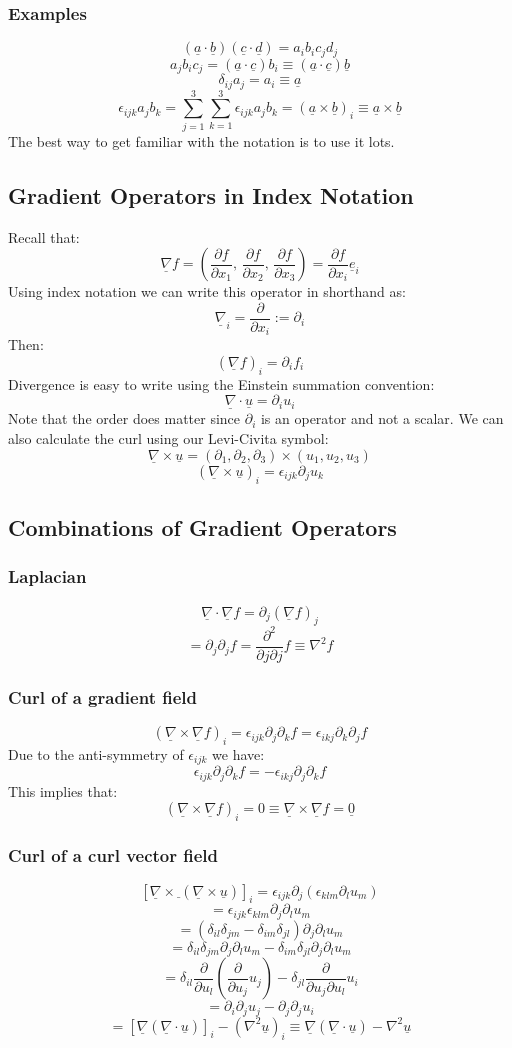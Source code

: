 \documentclass[12pt]{article}
\newcommand{\pf}[2]{\frac{\partial #1}{\partial #2}}
\newcommand{\dive}[1]{\underline{\nabla}\cdot\underline{#1}}
\newcommand{\grad}[1]{\underline{\nabla}#1}
\newcommand{\curl}[1]{\underline{\nabla}\times \underline{#1}}
\begin{document}
\subsubsection{Examples}
\[(\underline{a}\cdot\underline{b})(\underline{c}\cdot\underline{d})=a_ib_ic_jd_j\]
\[a_{j}b_ic_j=(\underline{a}\cdot\underline{c})b_i\equiv (\underline{a}\cdot \underline{c})\underline{b}\]
\[\delta_{ij}a_j=a_i\equiv\underline{a}\]
\[\epsilon_{ijk}a_jb_k=\sum^3_{j=1}\sum^3_{k=1}\epsilon_{ijk}a_jb_k=(\underline{a}\times\underline{b})_i\equiv \underline{a}\times \underline{b}\]
The best way to get familiar with the notation is to use it lots.
\subsection{Gradient Operators in Index Notation}
Recall that:
\[\grad{f}=\left(\pf{f}{x_1},\,\pf{f}{x_2},\,\pf{f}{x_3}\right)=\pf{f}{x_i}\underline{e}_i\]
Using index notation we can write this operator in shorthand as:
\[\underline{\nabla}_i=\pf{}{x_i}:=\partial_i\]
Then:
\[(\grad{f})_i=\partial_if_i\]
Divergence is easy to write using the Einstein summation convention:
\[\dive{u}=\partial_iu_i\]
Note that the order does matter since \(\partial_i\) is an operator and not a scalar. We can also calculate the curl using our Levi-Civita symbol:
\[\curl{u}=\left(\partial_1,\partial_2,\partial_3\right)\times(u_1,u_2,u_3)\]
\[(\curl{u})_i=\epsilon_{ijk}\partial_ju_k\]
\subsection{Combinations of Gradient Operators}
\subsubsection{Laplacian}
\[\dive{\nabla}f=\partial_j(\grad{f})_j\]
\[=\partial_j\partial_jf=\pf{^2}{j\partial j}f\equiv \nabla^2f\]
\subsubsection{Curl of a gradient field}
\[(\curl{\nabla}f)_i=\epsilon_{ijk}\partial_j\partial_kf=\epsilon_{ikj}\partial_k\partial_jf\]
Due to the anti-symmetry of \(\epsilon_{ijk}\) we have:
\[\epsilon_{ijk}\partial_j\partial_kf=-\epsilon_{ikj}\partial_j\partial_kf\]
This implies that:
\[(\curl{\nabla}f)_i=0\equiv \curl{\nabla}f=\underline{0}\]
\subsubsection{Curl of a curl vector field}
\[[\curl{}(\curl{u})]_i=\epsilon_{ijk}\partial_j(\epsilon_{klm}\partial_lu_m)\]
\[=\epsilon_{ijk}\epsilon_{klm}\partial_j\partial_lu_m\]
\[=(\delta_{il}\delta_{jm}-\delta_{im}\delta_{jl})\partial_j\partial_lu_m\]
\[=\delta_{il}\delta_{jm}\partial_{j}\partial_{l}u_m-\delta_{im}\delta_{jl}\partial_{j}\partial_lu_m\]
\[=\delta_{il}\pf{}{u_l}\left(\pf{}{u_j}u_j\right)-\delta_{jl}\pf{}{u_j\partial u_l}u_i\]
\[=\partial_{i}\partial_ju_j-\partial_j\partial_ju_i\]
\[=[\underline{\nabla}(\dive{u})]_i-(\nabla^2\underline{u})_i\equiv\underline{\nabla}(\dive{u})-\nabla^2\underline{u}\]
\end{document}
